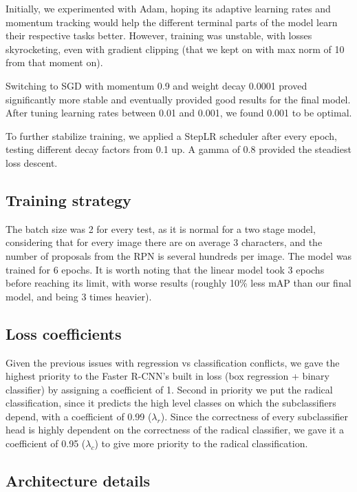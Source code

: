 Initially, we experimented with Adam, hoping its adaptive learning rates and momentum tracking would help the different terminal parts of the model learn their respective tasks better. However, training was unstable, with losses skyrocketing, even with gradient clipping (that we kept on with max norm of 10 from that moment on).

Switching to SGD with momentum 0.9 and weight decay 0.0001 proved significantly more stable and eventually provided good results for the final model. After tuning learning rates between 0.01 and 0.001, we found 0.001 to be optimal.

To further stabilize training, we applied a StepLR scheduler after every epoch, testing different decay factors from 0.1 up. A gamma of 0.8 provided the steadiest loss descent.

\subsection{Training strategy}

The batch size was 2 for every test, as it is normal for a two stage model, considering that for every image there are on average 3 characters, and the number of proposals from the RPN is several hundreds per image. The model was trained for 6 epochs. It is worth noting that the linear model took 3 epochs before reaching its limit, with worse results (roughly 10\% less mAP than our final model, and being 3 times heavier).

\subsection{Loss coefficients}

Given the previous issues with regression vs classification conflicts, we gave the highest priority to the Faster R-CNN's built in loss (box regression + binary classifier) by assigning a coefficient of 1.
Second in priority we put the radical classification, since it predicts the high level classes on which the subclassifiers depend, with a coefficient of 0.99 ($\lambda_r$).
Since the correctness of every subclassifier head is highly dependent on the correctness of the radical classifier, we gave it a coefficient of 0.95 ($\lambda_c$) to give more priority to the radical classification.

\subsection{Architecture details}

